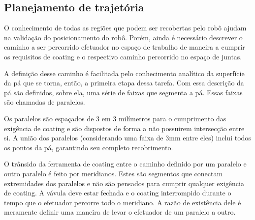 \subsection{Planejamento de trajetória}

O conhecimento de todas as regiões que podem ser recobertas pelo robô ajudam na
validação do posicionamento do robô. Porém, ainda é necessário descrever o
caminho a ser percorrido efetuador no espaço de trabalho de maneira a cumprir os
requisitos de coating e o respectivo caminho percorrido no espaço de juntas.

A definição desse caminho é facilitada pelo conhecimento analítico da superfície
da pá que se torna, então, a primeira etapa dessa tarefa. Com essa descrição da
pá são definidos, sobre ela, uma série de faixas que segmenta a pá. Essas
faixas são chamadas de paralelos.

Os paralelos são espaçados de 3 em 3 milímetros para o cumprimento das exigência
de coating e são dispostos de forma a não possuirem intersecção entre si. A
união dos paralelos (considerando uma faixa de 3mm entre eles) inclui todos os
pontos da pá, garantindo seu completo recobrimento.

O trânsido da ferramenta de coating entre o caminho definido por um
paralelo e outro paralelo é feito por meridianos. Estes são segmentos que
conectam extremidades dos paralelos e não são pensados para cumprir qualquer
exigência de coating. A vávula deve estar fechada e o coating interrompido
durante o tempo que o efetuador percorre todo o meridiano. A razão de existência
dele é meramente definir uma maneira de levar o efetuador de um paralelo a
outro.



